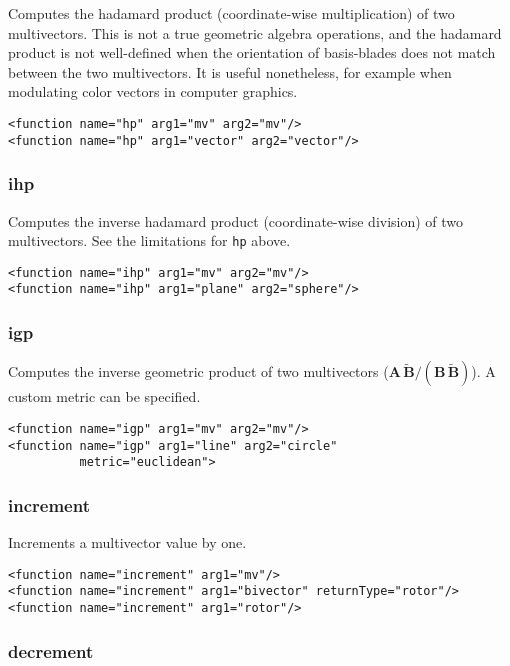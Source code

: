 \documentclass[10pt, a4paper]{article}
\newcommand{\gav}[1]{\ensuremath{\mathbf{#1}}}
\newcommand{\gp}{\,}
\newcommand{\rev}[1]{\widetilde{#1}}
\begin{document}
Computes the hadamard product (coordinate-wise multiplication) of two multivectors. This
is not a true geometric algebra operations, and the hadamard product is not well-defined
when the orientation of basis-blades does not match between the two multivectors. It is useful
nonetheless, for example when modulating color vectors in computer graphics.
\begin{verbatim}
<function name="hp" arg1="mv" arg2="mv"/>
<function name="hp" arg1="vector" arg2="vector"/>
\end{verbatim}

\subsubsection*{ihp}

Computes the inverse hadamard product (coordinate-wise division) of two multivectors. 
See the limitations for {\tt hp} above.
\begin{verbatim}
<function name="ihp" arg1="mv" arg2="mv"/>
<function name="ihp" arg1="plane" arg2="sphere"/>
\end{verbatim}


\subsubsection*{igp}

Computes the inverse geometric product of two multivectors ($\gav{A} \gp \rev{\gav{B}} / (\gav{B} \gp \rev{\gav{B}})$).
A custom metric can be specified.
\begin{verbatim}
<function name="igp" arg1="mv" arg2="mv"/>
<function name="igp" arg1="line" arg2="circle" 
          metric="euclidean">
\end{verbatim}

\subsubsection*{increment}

Increments a multivector value by one.
\begin{verbatim}
<function name="increment" arg1="mv"/>
<function name="increment" arg1="bivector" returnType="rotor"/>
<function name="increment" arg1="rotor"/>
\end{verbatim}

\subsubsection*{decrement}
\end{document}
